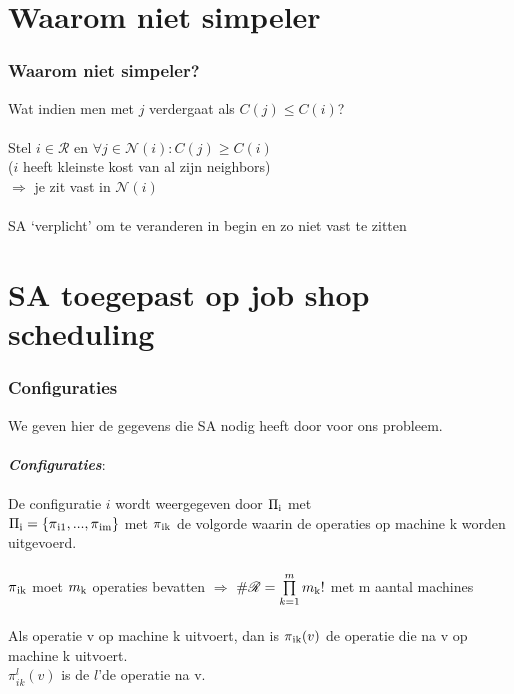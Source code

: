 \documentclass
   [kulak] %
   {kulakbeamer}
\begin{document}
\section[simpeler?]{Waarom niet simpeler}

\begin{frame}
	\frametitle{Waarom niet simpeler?}
	Wat indien men met $j$ verdergaat als $C(j) \leq C(i)$?\\~\\
	\pause
	Stel $i \in \mathscr{R}$ en $\forall j \in \mathscr{N}(i): C(j) \geqslant C(i)$ \\($i$ heeft kleinste kost van al zijn neighbors) \\
	$\Rightarrow$ je zit vast in $\mathscr{N}(i)$ \\~\\
	\pause
	SA `verplicht' om te veranderen in begin en zo niet vast te zitten
\end{frame}

\section[SA job shop]{SA toegepast op job shop scheduling}

\begin{frame}
	\frametitle{Configuraties}
	We geven hier de gegevens die SA nodig heeft door voor ons probleem.\pause 
	~\\~\\  \textbf{\textit{Configuraties}}: \\ ~\\
	De configuratie $i$ wordt weergegeven door $\Pi\textsubscript{i}$ met \\ $\Pi\textsubscript{i} = \{\pi\textsubscript{i1}, ... ,\pi\textsubscript{im}\}$
	met $\pi\textsubscript{ik}$ de volgorde waarin de operaties op machine k worden uitgevoerd.
	 \pause	~\\~\\ $\pi\textsubscript{ik}$ moet $m\textsubscript{k}$ operaties bevatten $\Rightarrow$ $\#\mathscr{R} = \prod\limits_{k=1}^m m\textsubscript{k}!$ met m aantal machines \\~\\ Als operatie v op machine k uitvoert, dan is $\pi\textsubscript{ik}(v)$ de operatie die na v op machine k uitvoert.\\
	 $\pi_{ik}^l (v)$ is de $l$'de operatie na v.

\end{frame}
\end{document}

